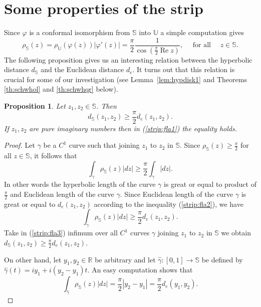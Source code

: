 \documentclass{amsart}
\newcommand{\re}{\mathop{\mathrm{Re}}}
\newtheorem{proposition}{Proposition}
\begin{document}



\section{Some properties of the strip}

Since $\varphi$ is a conformal isomorphism from $\mathbb{S}$ into $\mathbb{U}$ a simple computation gives
$$
\rho_{\mathbb{S}}(z)=\rho_{\mathbb{U}}(\varphi(z))|\varphi'(z)|=\frac{\pi}{2}\frac{1}{\cos{\left(\displaystyle\frac{\pi}{2}\re{z}\right)}}, \quad \mbox{ for all } \quad z\in\mathbb{S}.
$$
The following proposition gives us an interesting relation between the hyperbolic distance $d_{\mathbb{S}}$ and the Euclidean distance $d_e$. It turns out that this relation is crucial for some of our investigation (see Lemma~\ref{lem:hypdisk1} and Theorems \ref{th:schwhol} and \ref{th:schwhqr} below).



\begin{proposition}\label{prop:strip}
Let $z_1,z_2\in\mathbb{S}$. Then
\begin{equation}\label{strip:fla1}
d_{\mathbb{S}}(z_1,z_2)\geqslant\frac{\pi}{2}d_e(z_1,z_2).
\end{equation}
If $z_1,z_2$ are pure imaginary numbers then in (\ref{strip:fla1}) the equality holds.
\end{proposition}

\begin{proof} Let $\gamma$ be a $C^1$ curve such that joining $z_1$ to $z_2$ in $\mathbb{S}$.  Since $\displaystyle\rho_{\mathbb{S}}(z)\geqslant\frac{\pi}{2}$ for all $z\in\mathbb{S}$, it follows that
\begin{equation}\label{strip:fla2}
      \int_{\gamma}\rho_{\mathbb{S}}(z)|dz|\geqslant\frac{\pi}{2}\int_{\gamma}|dz|.
\end{equation}
In other words the hyperbolic length of the curve $\gamma$ is great or equal to product of $\displaystyle\frac{\pi}{2}$ and Euclidean length of the curve $\gamma$. Since Euclidean length of the curve $\gamma$ is great or equal to $d_e(z_1,z_2)$ according to the inequality (\ref{strip:fla2}), we have
\begin{equation}\label{strip:fla3}
    \int_{\gamma}\rho_{\mathbb{S}}(z)|dz|\geqslant\frac{\pi}{2}d_e(z_1,z_2).
\end{equation}
Take in (\ref{strip:fla3}) infimum over all $C^1$ curves $\gamma$ joining $z_1$ to $z_2$ in $\mathbb{S}$ we obtain $\displaystyle d_{\mathbb{S}}(z_1,z_2)\geqslant\frac{\pi}{2}d_e(z_1,z_2).$

On other hand, let $y_1,y_2\in\mathbb{R}$ be arbitrary and let $\widehat{\gamma}:[0,1]\rightarrow\mathbb{S}$ be defined by $\widehat{\gamma}(t)=iy_1+i(y_2-y_1)t$. An easy computation shows that
\begin{equation}\label{strip:fla4}
   \int_{\widehat{\gamma}}\rho_{\mathbb{S}}(z)|dz|=\frac{\pi}{2}|y_2-y_1|=\frac{\pi}{2}d_e(y_1,y_2).
\end{equation}
\end{proof}
\end{document}
